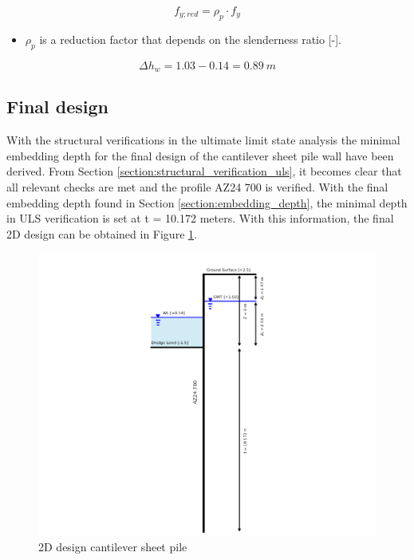\begin{equation}
    f_{y;red} = \rho_{p} \cdot f_{y}
    \label{eq:reduction_factor}
\end{equation}

\begin{itemize}
    \item $\rho_{p}$ is a reduction factor that depends on the slenderness ratio [-]. 
\end{itemize}

$$
    \Delta h_w = 1.03 - 0.14 = 0.89 \ m
    \label{eq:water_level_difference}
$$

\subsection{Final design}

With the structural verifications in the ultimate limit state analysis the minimal embedding depth for the final design of the cantilever sheet pile wall have been derived. From Section \ref{section:structural_verification_uls}, it becomes clear that all relevant checks are met and the profile AZ24 700 is verified. With the final embedding depth found in Section \ref{section:embedding_depth}, the minimal depth in ULS verification is set at t = 10.172 meters. With this information, the final 2D design can be obtained in Figure \ref{fig:final_design}. 


\begin{figure}[H]
    \centering
    \includegraphics[width=1.00\linewidth]{figures/ch8/final_design.png}
    \caption{2D design cantilever sheet pile}
    \label{fig:final_design}
\end{figure}

